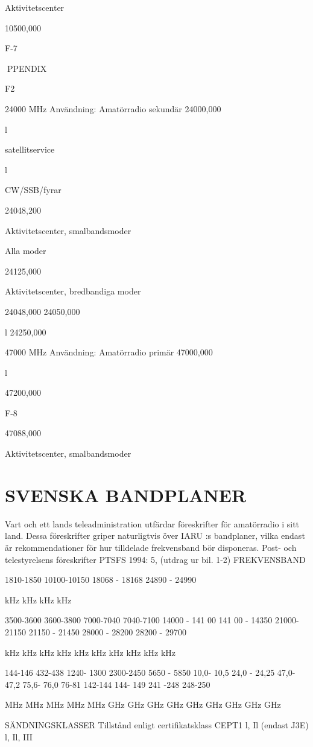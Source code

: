 \documentclass[a4paper,twoside,twocolumn,openright]{book}
\begin{document}
{{{{{{{{{{{Aktivitetscenter

10500,000

F-7

PPENDIX

F2

24000 MHz Användning: Amatörradio sekundär
24000,000

l

satellitservice

l

CW/SSB/fyrar

24048,200

Aktivitetscenter, smalbandsmoder

Alla moder

24125,000

Aktivitetscenter,
bredbandiga moder

24048,000
24050,000

l
24250,000

47000 MHz Användning: Amatörradio primär
47000,000

l

47200,000

F-8

47088,000

Aktivitetscenter, smalbandsmoder

\chapter{SVENSKA BANDPLANER}
Vart och ett lands teleadministration utfärdar föreskrifter för amatörradio i sitt land. Dessa
föreskrifter griper naturligtvis över IARU :s bandplaner, vilka endast är rekommendationer för
hur tilldelade frekvensband bör disponeras.
Post- och telestyrelsens föreskrifter PTSFS 1994: 5, (utdrag ur bil. 1-2)
FREKVENSBAND

1810-1850
10100-10150
18068 - 18168
24890 - 24990

kHz
kHz
kHz
kHz

3500-3600
3600-3800
7000-7040
7040-7100
14000 - 141 00
141 00 - 14350
21000-21150
21150 - 21450
28000 - 28200
28200 - 29700

kHz
kHz
kHz
kHz
kHz
kHz
kHz
kHz
kHz
kHz

144-146
432-438
1240- 1300
2300-2450
5650 - 5850
10,0- 10,5
24,0 - 24,25
47,0- 47,2
75,6- 76,0
76-81
142-144
144- 149
241 -248
248-250

MHz
MHz
MHz
MHz
MHz
GHz
GHz
GHz
GHz
GHz
GHz
GHz
GHz
GHz

SÄNDNINGSKLASSER
Tillstånd enligt
certifikatsklass
CEPT1
l, Il (endast J3E)
l, Il, III

}}}}}}}}}}}
\end{document}
